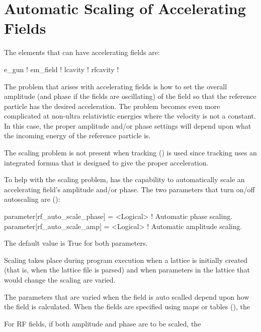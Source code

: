 \chapter{Automatic Scaling of Accelerating Fields}
\label{c:autoscale}

The elements that can have accelerating fields are:
\begin{example}
  e_gun       ! 
  em_field    ! 
  lcavity     ! 
  rfcavity    ! 
\end{example}

The problem that arises with accelerating fields is how to set the
overall amplitude (and phase if the fields are oscillating) of the
field so that the reference particle has the desired acceleration. The
problem becomes even more complicated at non-ultra relativistic
energies where the velocity is not a constant. In this case, the
proper amplitude and/or phase settings will depend upon what the
incoming energy of the reference particle is.

The scaling problem is not present when  tracking
() is used since  tracking uses an
integrated formua that is designed to give the proper acceleration.

To help with the scaling problem, \bmad has the capability to automatically
scale an accelerating field's amplitude and/or phase. The two
parameters that turn on/off autoscaling are ():
\begin{example}
  parameter[rf_auto_scale_phase]    = <Logical>  ! Automatic phase scaling.
  parameter[rf_auto_scale_amp]      = <Logical>  ! Automatic amplitude scaling.
\end{example}
The default value is True for both parameters. 

Scaling takes place during program execution when a lattice is
initially created (that is, when the lattice file is parsed) and when
parameters in the lattice that would change the scaling are varied.

The parameters that are varied when the field is auto scalled depend
upon how the field is calculated. When the fields are specified using
maps or tables (), the 




For RF fields, if both amplitude and phase are to be scaled, the 








